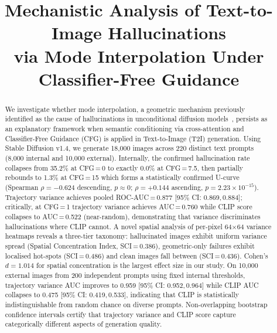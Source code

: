 \documentclass[conference]{IEEEtran}
\begin{document}
\title{Mechanistic Analysis of Text-to-Image Hallucinations\\
via Mode Interpolation Under Classifier-Free Guidance}

\author{
  \and
}

\maketitle

\begin{abstract}
We investigate whether mode interpolation, a geometric mechanism
previously identified as the cause of hallucinations in unconditional
diffusion models~\cite{yi2024understanding}, persists as an explanatory
framework when semantic conditioning via cross-attention and
Classifier-Free Guidance (CFG) is applied in Text-to-Image (T2I)
generation. Using Stable Diffusion v1.4, we generate 18{,}000 images
across 220 distinct text prompts (8{,}000 internal and 10{,}000 external). Internally, the confirmed hallucination rate
collapses from 35.2\% at CFG\,=\,0 to exactly 0.0\% at CFG\,=\,7.5,
then partially rebounds to 1.3\% at CFG\,=\,15 which forms a
statistically confirmed U-curve (Spearman $\rho{=}{-}0.624$
descending, $p{\approx}0$; $\rho{=}{+}0.144$ ascending,
$p{=}2.23{\times}10^{-15}$). Trajectory variance achieves pooled
ROC-AUC\,=\,0.877 [95\% CI: 0.869,\,0.884]; critically, at CFG\,=\,1
trajectory variance achieves AUC\,=\,0.760 while CLIP score
collapses to AUC\,=\,0.522 (near-random), demonstrating that variance
discriminates hallucinations where CLIP cannot. A novel spatial
analysis of per-pixel 64$\times$64 variance heatmaps reveals a
three-tier taxonomy: hallucinated images exhibit uniform variance
spread (Spatial Concentration Index, SCI\,=\,0.386), geometric-only
failures exhibit localised hot-spots (SCI\,=\,0.486) and clean
images fall between (SCI\,=\,0.436). Cohen's $d{=}1.014$ for spatial
concentration is the largest effect size in our study. On 10{,}000
external images from 200 independent prompts using fixed internal
thresholds, trajectory variance AUC improves to 0.959 [95\% CI:
0.952,\,0.964] while CLIP AUC collapses to 0.475 [95\% CI:
0.419,\,0.533], indicating that CLIP is statistically indistinguishable from random chance on diverse prompts.
Non-overlapping bootstrap confidence intervals certify that trajectory
variance and CLIP score capture categorically different aspects of
generation quality.
\end{abstract}
\end{document}
